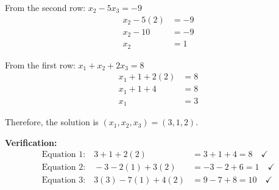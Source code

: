 From the second row: $x_2 - 5x_3 = -9$
\begin{align*}
	x_2 - 5(2) & = -9 \\
	x_2 - 10   & = -9 \\
	x_2        & = 1
\end{align*}

From the first row: $x_1 + x_2 + 2x_3 = 8$
\begin{align*}
	x_1 + 1 + 2(2) & = 8 \\
	x_1 + 1 + 4    & = 8 \\
	x_1            & = 3
\end{align*}

Therefore, the solution is $\boxed{(x_1, x_2, x_3) = (3, 1, 2)}$.

\textbf{Verification:}
\begin{align*}
	\text{Equation 1:} \quad 3 + 1 + 2(2)       & = 3 + 1 + 4 = 8 \quad \checkmark  \\
	\text{Equation 2:} \quad -3 - 2(1) + 3(2)   & = -3 - 2 + 6 = 1 \quad \checkmark \\
	\text{Equation 3:} \quad 3(3) - 7(1) + 4(2) & = 9 - 7 + 8 = 10 \quad \checkmark
\end{align*}